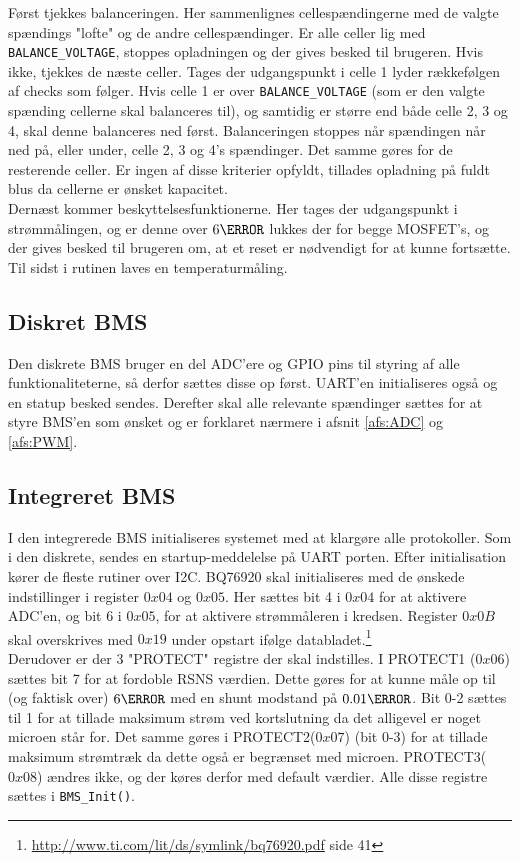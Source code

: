 Først tjekkes balanceringen. Her sammenlignes cellespændingerne med de valgte spændings \space "lofte" \space og de andre cellespændinger. Er alle celler lig med \verb|BALANCE_VOLTAGE|, stoppes opladningen og der gives besked til brugeren. Hvis ikke, tjekkes de næste celler. Tages der udgangspunkt i celle 1 lyder rækkefølgen af checks som følger. Hvis celle 1 er over \verb|BALANCE_VOLTAGE| (som er den valgte spænding cellerne skal balanceres til), og samtidig er større end både celle 2, 3 og 4, skal denne balanceres ned først. Balanceringen stoppes når spændingen når ned på, eller under, celle 2, 3 og 4's spændinger. Det samme gøres for de resterende celler. Er ingen af disse kriterier opfyldt, tillades opladning på fuldt blus da cellerne er ønsket kapacitet.\\

Dernæst kommer beskyttelsesfunktionerne. Her tages der udgangspunkt i strømmålingen, og er denne over $6\ampere$ lukkes der for begge MOSFET's, og der gives besked til brugeren om, at et reset er nødvendigt for at kunne fortsætte. Til sidst i rutinen laves en temperaturmåling. \\

\subsection{Diskret BMS}
Den diskrete BMS bruger en del ADC'ere og GPIO pins til styring af alle funktionaliteterne, så derfor sættes disse op først. UART'en initialiseres også og en statup besked sendes. Derefter skal alle relevante spændinger sættes for at styre BMS'en som ønsket og er forklaret nærmere i afsnit \ref{afs:ADC} og \ref{afs:PWM}.

\subsection{Integreret BMS}
I den integrerede BMS initialiseres systemet med at klargøre alle protokoller. Som i den diskrete, sendes en startup-meddelelse på UART porten. Efter initialisation kører de fleste rutiner over I2C. BQ76920 skal initialiseres med de ønskede indstillinger i register $0x04$ og $0x05$. Her sættes bit 4 i $0x04$ for at aktivere ADC'en, og bit 6 i $0x05$, for at aktivere strømmåleren i kredsen. Register $0x0B$ skal overskrives med $0x19$ under opstart ifølge databladet.\footnote{\url{http://www.ti.com/lit/ds/symlink/bq76920.pdf} side 41} \\

Derudover er der 3 "PROTECT" \space registre der skal indstilles. I PROTECT1 ($0x06$) sættes bit 7 for at fordoble RSNS værdien. Dette gøres for at kunne måle op til (og faktisk over) $6\ampere$ med en shunt modstand på $0.01\ohm$. Bit 0-2 sættes til 1 for at tillade maksimum strøm ved kortslutning da det alligevel er noget microen står for. Det samme gøres i PROTECT2($0x07$) (bit 0-3) for at tillade maksimum strømtræk da dette også er begrænset med microen. PROTECT3($0x08$) ændres ikke, og der køres derfor med default værdier. Alle disse registre sættes i \verb|BMS_Init()|.


